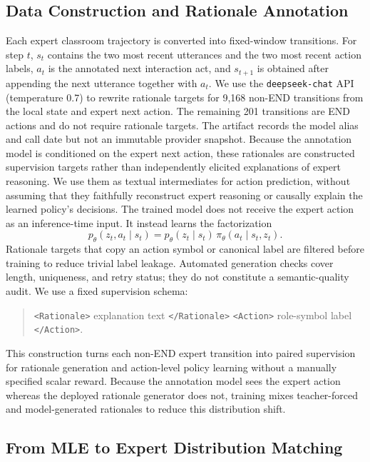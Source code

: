 \documentclass[manuscript,review,anonymous]{acmart}
\begin{document}
\subsection{Data Construction and Rationale Annotation}

Each expert classroom trajectory is converted into fixed-window transitions.
For step $t$, $s_t$ contains the two most recent utterances and the two most recent action labels, $a_t$ is the annotated next interaction act, and $s_{t+1}$ is obtained after appending the next utterance together with $a_t$.
We use the \texttt{deepseek-chat} API (temperature 0.7) to rewrite rationale
targets for 9,168 non-END transitions from the local state and expert next
action. The remaining 201 transitions are END actions and do not require
rationale targets. The
artifact records the model alias and call date but not an immutable provider
snapshot. Because the annotation model is conditioned on the expert next
action, these rationales are constructed supervision targets rather than
independently elicited explanations of expert reasoning. We use them as textual
intermediates for action prediction, without assuming that they faithfully
reconstruct expert reasoning or causally explain the learned policy's decisions.
The trained model does not receive the expert action as an
inference-time input. It instead learns the factorization
\begin{equation}
p_\theta(z_t,a_t\mid s_t)
=p_\theta(z_t\mid s_t)\,\pi_\theta(a_t\mid s_t,z_t).
\label{eq:rationale-action-factorization}
\end{equation}
Rationale targets that copy an action symbol or canonical label are filtered before training to reduce trivial label leakage. Automated generation checks cover length, uniqueness, and retry status; they do not constitute a semantic-quality audit.
We use a fixed supervision schema:
\begin{quote}
\small
\texttt{<Rationale>} explanation text \texttt{</Rationale>} \quad
\texttt{<Action>} role-symbol label \texttt{</Action>}.
\end{quote}
This construction turns each non-END expert transition into paired supervision for rationale generation and action-level policy learning without a manually specified scalar reward. Because the annotation model sees the expert action whereas the deployed rationale generator does not, training mixes teacher-forced and model-generated rationales to reduce this distribution shift.

\subsection{From MLE to Expert Distribution Matching}
\end{document}
